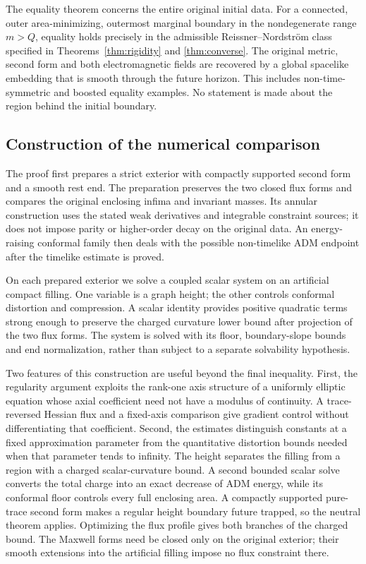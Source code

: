 The equality theorem concerns the entire original initial data.
For a connected, outer area-minimizing, outermost marginal boundary in the
nondegenerate range $m>Q$, equality holds precisely in the admissible
Reissner--Nordstr\"om class specified in
Theorems~\ref{thm:rigidity} and \ref{thm:converse}. The original metric,
second form and both electromagnetic fields are recovered by a global
spacelike embedding that is smooth through the future horizon. This
includes non-time-symmetric and boosted equality examples. No statement
is made about the region behind the initial boundary.

\subsection{Construction of the numerical comparison}

The proof first prepares a strict exterior with compactly supported second
form and a smooth rest end. The preparation preserves the two closed flux
forms and compares the original enclosing infima and invariant masses.
Its annular construction uses the stated weak derivatives and integrable
constraint sources; it does not impose parity or higher-order decay on
the original data. An energy-raising conformal family then deals with the
possible non-timelike ADM endpoint after the timelike estimate is proved.

On each prepared exterior we solve a coupled scalar system on an
artificial compact filling. One variable is a graph height; the other
controls conformal distortion and compression. A scalar identity provides
positive quadratic terms strong enough to preserve the charged
curvature lower bound after projection of the two flux forms. The system
is solved with its floor, boundary-slope bounds and end normalization,
rather than subject to a separate solvability hypothesis.

Two features of this construction are useful beyond the final
inequality. First, the regularity argument exploits the rank-one axis
structure of a uniformly elliptic equation whose axial coefficient need
not have a modulus of continuity. A trace-reversed Hessian flux and a
fixed-axis comparison give gradient control without differentiating that
coefficient. Second, the estimates distinguish constants at a fixed
approximation parameter from the quantitative distortion bounds needed
when that parameter tends to infinity. The height separates the filling
from a region with a charged scalar-curvature bound. A second bounded
scalar solve converts the total charge into an exact decrease of ADM
energy, while its conformal floor controls every full enclosing area.
A compactly supported pure-trace second form makes a regular height
boundary future trapped, so the neutral theorem applies. Optimizing the
flux profile gives both branches of the charged bound. The Maxwell
forms need be closed only on the original exterior; their smooth
extensions into the artificial filling impose no flux constraint there.

